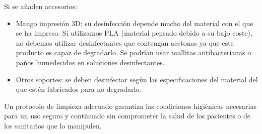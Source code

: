Si se añaden accesorios:
\begin{itemize}
    \item Mango impresión 3D: su desinfección depende mucho del material con el que se ha impreso. Si utilizamos PLA (material pensado debido a su bajo coste), no debemos utilizar desinfectantes que contengan acetonas ya que este producto es capaz de degradarlo. Se podrían usar toallitas antibacterianas o paños humedecidos en soluciones desinfectantes.
    \item Otros soportes: se deben desinfectar según las especificaciones del material del que estén fabricados para no degradarlo.  
\end{itemize}

Un protocolo de limpieza adecuado garantiza las condiciones higiénicas necesarias para un uso seguro y continuado sin comprometer la salud de los pacientes o de los sanitarios que lo manipulen.